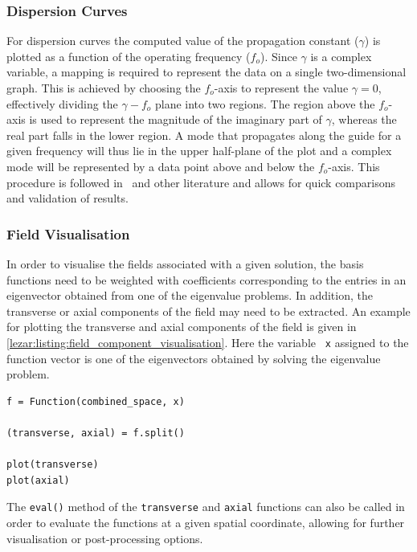 \subsubsection{Dispersion Curves}

For dispersion curves the computed value of the propagation constant
($\gamma$) is plotted as a function of the operating frequency
($f_o$).  Since $\gamma$ is a complex variable, a mapping is required
to represent the data on a single two-dimensional graph. This is
achieved by choosing the $f_o$-axis to represent the value $\gamma =
0$, effectively dividing the {$\gamma-f_o$} plane into two
regions. The region above the $f_o$-axis is used to represent the
magnitude of the imaginary part of $\gamma$, whereas the real part
falls in the lower region. A mode that propagates along the guide for
a given frequency will thus lie in the upper half-plane of the plot
and a complex mode will be represented by a data point above and below
the $f_o$-axis.  This procedure is followed in~\cite{PelCoc1998} and
other literature and allows for quick comparisons and validation of
results.

\subsubsection{Field Visualisation}

In order to visualise the fields associated with a given solution, the
basis functions need to be weighted with coefficients corresponding to
the entries in an eigenvector obtained from one of the eigenvalue
problems. In addition, the transverse or axial components of the field
may need to be extracted. An example for plotting the transverse and
axial components of the field is given in \lstlistingname{}
\ref{lezar:listing:field_component_visualisation}.  Here the variable {\tt
x} assigned to the function vector is one of the eigenvectors obtained
by solving the eigenvalue problem.

\begin{lstlisting}[float=h, caption=Extraction and visualisation of transverse and axial field components., label=lezar:listing:field_component_visualisation]
f = Function(combined_space, x)

(transverse, axial) = f.split()

plot(transverse)
plot(axial)
\end{lstlisting}

The {\tt eval()} method of the {\tt transverse} and {\tt axial}
functions can also be called in order to evaluate the functions at a
given spatial coordinate, allowing for further visualisation or
post-processing options.

